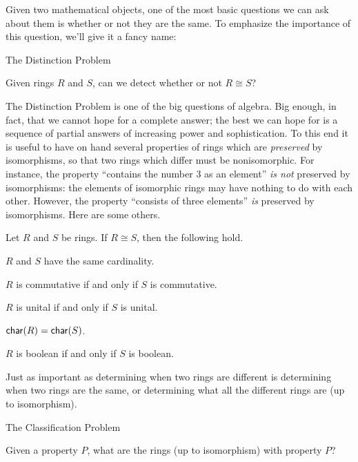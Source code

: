Given two mathematical objects, one of the most basic questions we can ask about them is whether or not they are the same. To emphasize the importance of this question, we'll give it a fancy name:

\begin{titlebox}{The Distinction Problem}
\begin{center}
Given rings \(R\) and \(S\), can we detect whether or not \(R \cong S\)?
\end{center}
\end{titlebox}

The Distinction Problem is one of the big questions of algebra. Big enough, in fact, that we cannot hope for a complete answer; the best we can hope for is a sequence of partial answers of increasing power and sophistication. To this end it is useful to have on hand several properties of rings which are \emph{preserved} by isomorphisms, so that two rings which differ must be nonisomorphic. For instance, the property ``contains the number 3 as an element'' \emph{is not} preserved by isomorphisms: the elements of isomorphic rings may have nothing to do with each other. However, the property ``consists of three elements'' \emph{is} preserved by isomorphisms. Here are some others.

\begin{prop} \label{prop:iso-preserved-props}
Let \(R\) and \(S\) be rings. If \(R \cong S\), then the following hold.
\begin{proplist*}
\item \(R\) and \(S\) have the same cardinality.
\item \(R\) is commutative if and only if \(S\) is commutative.
\item \(R\) is unital if and only if \(S\) is unital.
\item \(\mathsf{char}(R) = \mathsf{char}(S)\).
\item \(R\) is boolean if and only if \(S\) is boolean.
\end{proplist*}
\end{prop}

Just as important as determining when two rings are different is determining when two rings are the same, or determining what all the different rings are (up to isomorphism).

\begin{titlebox}{The Classification Problem}
\begin{center}
Given a property \(P\), what are the rings (up to isomorphism) with property \(P\)?
\end{center}
\end{titlebox}

